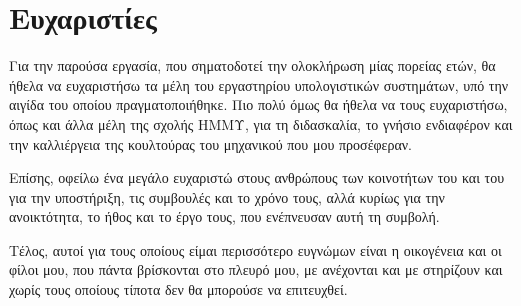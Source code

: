 \chapter*{Ευχαριστίες}
Για την παρούσα εργασία, που σηματοδοτεί την ολοκλήρωση μίας πορείας ετών, θα
ήθελα να ευχαριστήσω τα μέλη του εργαστηρίου υπολογιστικών συστημάτων, υπό την
αιγίδα του οποίου πραγματοποιήθηκε. Πιο πολύ όμως θα ήθελα να τους ευχαριστήσω,
όπως και άλλα μέλη της σχολής ΗΜΜΥ, για τη διδασκαλία, το γνήσιο ενδιαφέρον και
την καλλιέργεια της κουλτούρας του μηχανικού που μου προσέφεραν.

Επίσης, οφείλω ένα μεγάλο ευχαριστώ στους ανθρώπους των κοινοτήτων του \osv{}
και του \viofs{} για την υποστήριξη, τις συμβουλές και το χρόνο τους, αλλά
κυρίως για την ανοικτότητα, το ήθος και το έργο τους, που ενέπνευσαν αυτή τη
συμβολή.

Τέλος, αυτοί για τους οποίους είμαι περισσότερο ευγνώμων είναι η οικογένεια και
οι φίλοι μου, που πάντα βρίσκονται στο πλευρό μου, με ανέχονται και με στηρίζουν
και χωρίς τους οποίους τίποτα δεν θα μπορούσε να επιτευχθεί.
